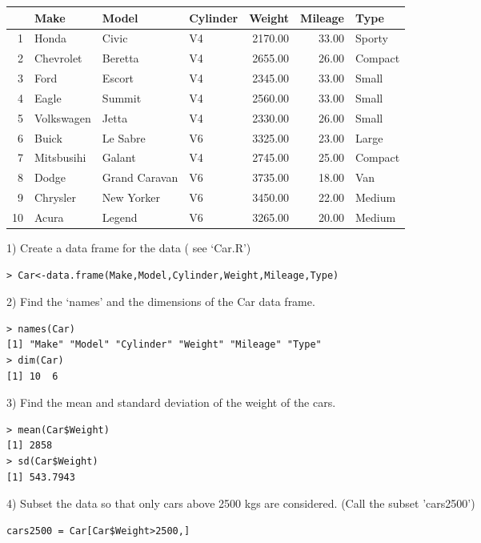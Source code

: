 \begin{table}[ht]
\begin{center}
\begin{tabular}{rlllrrl}
  \hline
 & Make & Model & Cylinder & Weight & Mileage & Type \\
  \hline
1 & Honda & Civic & V4 & 2170.00 & 33.00 & Sporty \\
  2 & Chevrolet & Beretta & V4 & 2655.00 & 26.00 & Compact \\
  3 & Ford & Escort & V4 & 2345.00 & 33.00 & Small \\
  4 & Eagle & Summit & V4 & 2560.00 & 33.00 & Small \\
  5 & Volkswagen & Jetta & V4 & 2330.00 & 26.00 & Small \\
  6 & Buick & Le Sabre & V6 & 3325.00 & 23.00 & Large \\
  7 & Mitsbusihi & Galant & V4 & 2745.00 & 25.00 & Compact \\
  8 & Dodge & Grand Caravan & V6 & 3735.00 & 18.00 & Van \\
  9 & Chrysler & New Yorker & V6 & 3450.00 & 22.00 & Medium \\
  10 & Acura & Legend & V6 & 3265.00 & 20.00 & Medium \\
   \hline
\end{tabular}
\end{center}
\end{table}



1) Create a data frame for the data ( see `Car.R')
\begin{verbatim}
> Car<-data.frame(Make,Model,Cylinder,Weight,Mileage,Type)
\end{verbatim}

2) Find the `names' and the dimensions of the Car data frame.
\begin{verbatim}
> names(Car)
[1] "Make" "Model" "Cylinder" "Weight" "Mileage" "Type"
> dim(Car)
[1] 10  6
\end{verbatim}

3) Find the mean and standard deviation of the weight of the cars.
\begin{verbatim}
> mean(Car$Weight)
[1] 2858
> sd(Car$Weight)
[1] 543.7943
\end{verbatim}

4) Subset the data so that only cars above 2500 kgs are considered. (Call the subset 'cars2500')
\begin{verbatim}
cars2500 = Car[Car$Weight>2500,]
\end{verbatim}

